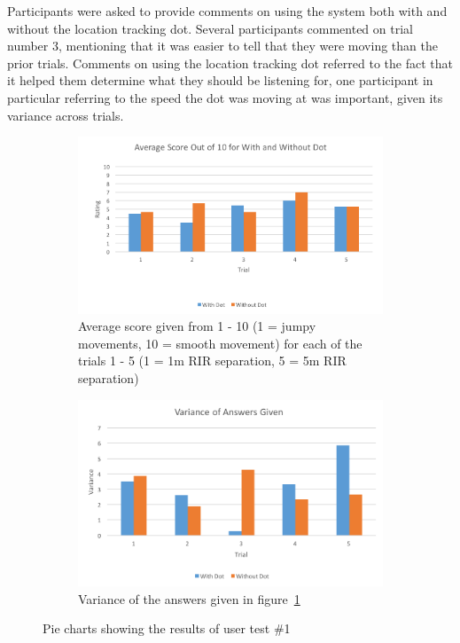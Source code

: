 \documentclass[../../main.tex]{subfiles}
\begin{document}
				Participants were asked to provide comments on using the system both with and without the location tracking dot. Several participants commented on trial number 3, mentioning that it was easier to tell that they were moving than the prior trials. Comments on using the location tracking dot referred to the fact that it helped them determine what they should be listening for, one participant in particular referring to the speed the dot was moving at was important, given its variance across trials.


				\begin{figure}[H]
					\begin{subfigure}{1\textwidth}
						\centerline{\includegraphics[scale = 0.7]{Sections/userTesting/images/test3/Q3Score.png}}
						\caption{Average score given from 1 - 10 (1 = jumpy movements, 10 = smooth movement) for each of the trials 1 - 5 (1 = 1m \ac{RIR} separation, 5 = 5m \ac{RIR} separation)}
						\label{score}
					\end{subfigure}
					
					\begin{subfigure}{1\textwidth}
						\centerline{\includegraphics[scale = 0.7]{Sections/userTesting/images/test3/Q3Variance.png}}
						\caption{Variance of the answers given in figure~\ref{score}}
						\label{variance}
					\end{subfigure}
					\caption{Pie charts showing the results of user test \#1}
					\label{test1Results}
				\end{figure}
\end{document}
